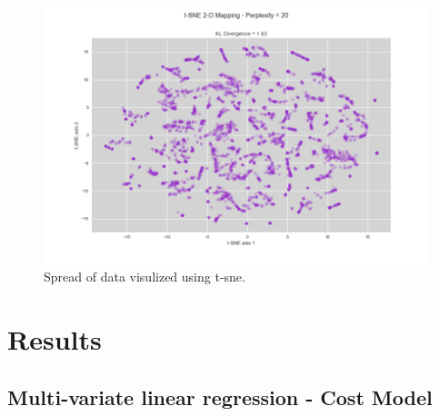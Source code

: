 \documentclass{llncs}
\begin{document}
\FloatBarrier
\begin{figure}
 	\includegraphics[width=\textwidth, height=\textheight, keepaspectratio]{perplexity.png}
 	\caption{Spread of data visulized using t-sne.}
	\label{figure:perplexity}

\end{figure}
\FloatBarrier
%
\section{Results}
%
\subsection{Multi-variate linear regression - Cost Model}
\end{document}
